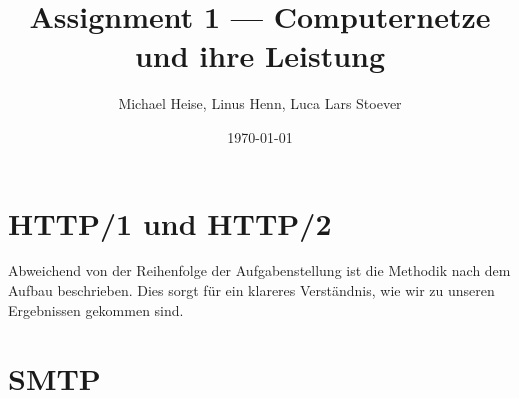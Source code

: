 \documentclass{article}
\title{Assignment 1 --- Computernetze und ihre Leistung}
\author{Michael Heise, Linus Henn, Luca Lars Stoever}
\date{\today}
\begin{document}


\begin{titlepage}

\end{titlepage}

\newpage

\renewcommand*\contentsname{Contents / Inhaltsverzeichnis}
\tableofcontents
\thispagestyle{empty}

\newpage

\setcounter{page}{1}
\section{HTTP/1 und HTTP/2}

Abweichend von der Reihenfolge der Aufgabenstellung ist die Methodik nach dem Aufbau beschrieben. Dies sorgt für ein klareres Verständnis, wie wir zu unseren Ergebnissen gekommen sind.















\newpage

\section{SMTP}


\newpage



\end{document}
